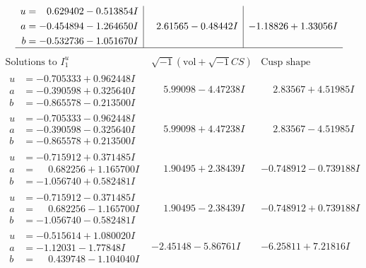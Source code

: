 \documentclass[1p]{elsarticle_modified}
\theoremstyle{definition}
\newcommand{\I}{\sqrt{-1}}
\begin{document}
$$\begin{array}{c|c|c}
\begin{aligned}
u &= \phantom{-}0.629402 - 0.513854 I \\
a &= -0.454894 - 1.264650 I \\
b &= -0.532736 - 1.051670 I\end{aligned}
 & \phantom{-}2.61565 - 0.48442 I & -1.18826 + 1.33056 I\\
 \hline 
 \end{array}$$\newpage$$\begin{array}{c|c|c}  
\text{Solutions to }I^u_{1}& \I (\text{vol} + \sqrt{-1}CS) & \text{Cusp shape}\\
 \hline 
\begin{aligned}
u &= -0.705333 + 0.962448 I \\
a &= -0.390598 + 0.325640 I \\
b &= -0.865578 - 0.213500 I\end{aligned}
 & \phantom{-}5.99098 - 4.47238 I & \phantom{-}2.83567 + 4.51985 I \\ \hline\begin{aligned}
u &= -0.705333 - 0.962448 I \\
a &= -0.390598 - 0.325640 I \\
b &= -0.865578 + 0.213500 I\end{aligned}
 & \phantom{-}5.99098 + 4.47238 I & \phantom{-}2.83567 - 4.51985 I \\ \hline\begin{aligned}
u &= -0.715912 + 0.371485 I \\
a &= \phantom{-}0.682256 + 1.165700 I \\
b &= -1.056740 + 0.582481 I\end{aligned}
 & \phantom{-}1.90495 + 2.38439 I & -0.748912 - 0.739188 I \\ \hline\begin{aligned}
u &= -0.715912 - 0.371485 I \\
a &= \phantom{-}0.682256 - 1.165700 I \\
b &= -1.056740 - 0.582481 I\end{aligned}
 & \phantom{-}1.90495 - 2.38439 I & -0.748912 + 0.739188 I \\ \hline\begin{aligned}
u &= -0.515614 + 1.080020 I \\
a &= -1.12031 - 1.77848 I \\
b &= \phantom{-}0.439748 - 1.104040 I\end{aligned}
 & -2.45148 - 5.86761 I & -6.25811 + 7.21816 I \\ \hline\begin{aligned}

\end{aligned}
\end{array}$$
\end{document}
